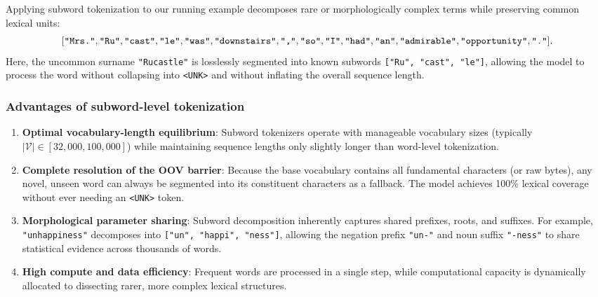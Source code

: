 \documentclass[../../main.tex]{subfiles}
\begin{document}
Applying subword tokenization to our running example decomposes rare or morphologically complex terms while preserving common lexical units:
\begin{equation}
\label{eq:subword_token_example}
[\text{\texttt{"Mrs."}}, \text{\texttt{"Ru"}}, \text{\texttt{"cast"}}, \text{\texttt{"le"}}, \text{\texttt{"was"}}, \text{\texttt{"downstairs"}}, \text{\texttt{","}}, \text{\texttt{"so"}}, \text{\texttt{"I"}}, \text{\texttt{"had"}}, \text{\texttt{"an"}}, \text{\texttt{"admirable"}}, \text{\texttt{"opportunity"}}, \text{\texttt{"."}}].
\end{equation}
Here, the uncommon surname \texttt{"Rucastle"} is losslessly segmented into known subwords \texttt{["Ru", "cast", "le"]}, allowing the model to process the word without collapsing into \texttt{<UNK>} and without inflating the overall sequence length.

\subsubsection{Advantages of subword-level tokenization}
\begin{enumerate}
    \item \textbf{Optimal vocabulary-length equilibrium}: Subword tokenizers operate with manageable vocabulary sizes (typically $|\mathcal{V}| \in [32{,}000, 100{,}000]$) while maintaining sequence lengths only slightly longer than word-level tokenization.
    \item \textbf{Complete resolution of the OOV barrier}: Because the base vocabulary contains all fundamental characters (or raw bytes), any novel, unseen word can always be segmented into its constituent characters as a fallback. The model achieves 100\% lexical coverage without ever needing an \texttt{<UNK>} token.
    \item \textbf{Morphological parameter sharing}: Subword decomposition inherently captures shared prefixes, roots, and suffixes. For example, \texttt{"unhappiness"} decomposes into \texttt{["un", "happi", "ness"]}, allowing the negation prefix \texttt{"un-"} and noun suffix \texttt{"-ness"} to share statistical evidence across thousands of words.
    \item \textbf{High compute and data efficiency}: Frequent words are processed in a single step, while computational capacity is dynamically allocated to dissecting rarer, more complex lexical structures.
\end{enumerate}
\end{document}
